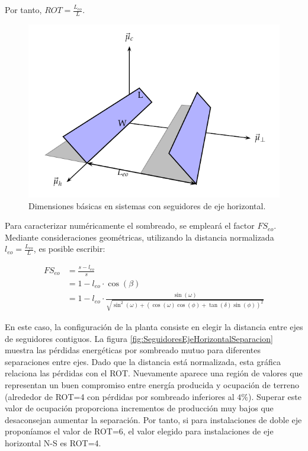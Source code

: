 Por tanto, $ROT=\frac{L_{eo}}{L}$.

\begin{figure}
  \centering
  \includegraphics[scale=0.9]{../figs/SombrasHoriz}
  \caption{Dimensiones básicas en sistemas con seguidores de eje horizontal.}
  \label{fig:SeguidorEjeHorizontalSombras}
\end{figure}

Para caracterizar numéricamente el sombreado, se empleará el factor
$FS_{eo}$. Mediante consideraciones geométricas, utilizando la
distancia normalizada $l_{eo}=\frac{L_{eo}}{L}$, es posible escribir:

\begin{align}
FS_{eo} & =\frac{s-l_{eo}}{s}\nonumber \\
 & =1-l_{eo}\cdot\cos(\beta)\nonumber \\
 &
 =1-l_{eo}\cdot\frac{\sin(\omega)}{\sqrt{\sin^{2}(\omega)+\left(\cos(\omega)\cos(\phi)+\tan(\delta)\sin(\phi)\right)^{2}}}\label{eq:FSeoHorizontal}
\end{align}

En este caso, la  configuración
de la planta consiste en elegir la distancia entre ejes de seguidores
contiguos. La figura \ref{fig:SeguidoresEjeHorizontalSeparacion}
muestra las pérdidas energéticas por sombreado mutuo para diferentes
separaciones entre ejes. Dado que la distancia está normalizada, esta gráfica relaciona las pérdidas con el ROT.
Nuevamente aparece una región de valores que representan un buen compromiso
entre energía producida y ocupación de terreno (alrededor de ROT=4
con pérdidas por sombreado inferiores al $4\%$). Superar este valor
de ocupación proporciona incrementos de producción muy bajos que desaconsejan
aumentar la separación. Por tanto, si para instalaciones de doble eje proponíamos el valor
de ROT=6, el valor elegido para instalaciones de eje horizontal N-S
es ROT=4.

